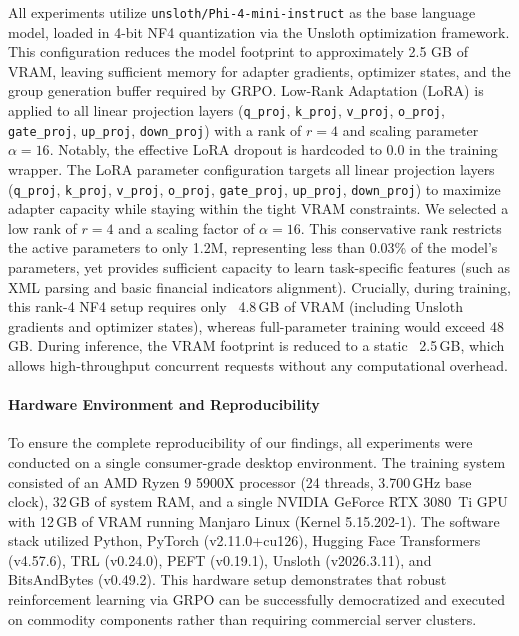     All experiments utilize \texttt{unsloth/Phi-4-mini-instruct} as the base language model, loaded in 4-bit NF4 quantization via the Unsloth optimization framework. This configuration reduces the model footprint to approximately 2.5 GB of VRAM, leaving sufficient memory for adapter gradients, optimizer states, and the group generation buffer required by GRPO. Low-Rank Adaptation (LoRA) \cite{hu2022lora} is applied to all linear projection layers (\texttt{q\_proj}, \texttt{k\_proj}, \texttt{v\_proj}, \texttt{o\_proj}, \texttt{gate\_proj}, \texttt{up\_proj}, \texttt{down\_proj}) with a rank of $r=4$ and scaling parameter $\alpha=16$. Notably, the effective LoRA dropout is hardcoded to 0.0 in the training wrapper.    The LoRA parameter configuration targets all linear projection layers (\texttt{q\_proj}, \texttt{k\_proj}, \texttt{v\_proj}, \texttt{o\_proj}, \texttt{gate\_proj}, \texttt{up\_proj}, \texttt{down\_proj}) to maximize adapter capacity while staying within the tight VRAM constraints. We selected a low rank of $r=4$ and a scaling factor of $\alpha=16$. This conservative rank restricts the active parameters to only 1.2M, representing less than 0.03\% of the model's parameters, yet provides sufficient capacity to learn task-specific features (such as XML parsing and basic financial indicators alignment). Crucially, during training, this rank-4 NF4 setup requires only ~4.8\,GB of VRAM (including Unsloth gradients and optimizer states), whereas full-parameter training would exceed 48\,GB. During inference, the VRAM footprint is reduced to a static ~2.5\,GB, which allows high-throughput concurrent requests without any computational overhead.

    \paragraph{Hardware Environment and Reproducibility}

    To ensure the complete reproducibility of our findings, all experiments were conducted on a single consumer-grade desktop environment. The training system consisted of an AMD Ryzen 9 5900X processor (24 threads, 3.700\,GHz base clock), 32\,GB of system RAM, and a single NVIDIA GeForce RTX 3080~Ti GPU with 12\,GB of VRAM running Manjaro Linux (Kernel 5.15.202-1). The software stack utilized Python, PyTorch (v2.11.0+cu126), Hugging Face Transformers (v4.57.6), TRL (v0.24.0), PEFT (v0.19.1), Unsloth (v2026.3.11), and BitsAndBytes (v0.49.2). This hardware setup demonstrates that robust reinforcement learning via GRPO can be successfully democratized and executed on commodity components rather than requiring commercial server clusters.


